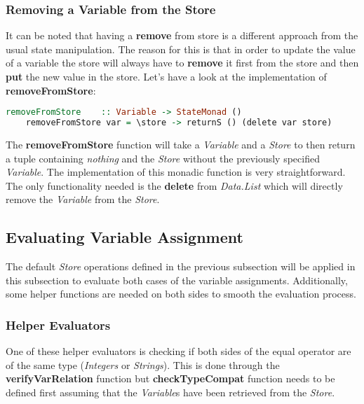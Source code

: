 \documentclass[a4paper, onecolumn]{article}
\begin{document}
    \subsubsection{Removing a Variable from the Store}
    
    It can be noted that having a \textbf{remove} from store is a different approach from the usual state manipulation. The reason for this is that in order to update the value of a variable the store will always have to \textbf{remove} it first from the store and then \textbf{put} the new value in the store. Let's have a look at the implementation of \textbf{removeFromStore}:
    
    \begin{tcolorbox}
    \begin{lstlisting}[language=Haskell] 
    removeFromStore    :: Variable -> StateMonad () 
    removeFromStore var = \store -> returnS () (delete var store) 
    \end{lstlisting}
    \end{tcolorbox}
    
    \noindent The \textbf{removeFromStore} function will take a \textit{Variable} and a \textit{Store} to then return a tuple containing \textit{nothing} and the \textit{Store} without the previously specified \textit{Variable}. The implementation of this monadic function is very straightforward. The only functionality needed is the \textbf{delete} from \textit{Data.List} which will directly remove the \textit{Variable} from the \textit{Store}.  
    
    \subsection{Evaluating Variable Assignment}
    
    The default \textit{Store} operations defined in the previous subsection will be applied in this subsection to evaluate both cases of the variable assignments. Additionally, some helper functions are needed on both sides to smooth the evaluation process. 
    
    \subsubsection{Helper Evaluators}
    
    One of these helper evaluators is checking if both sides of the equal operator are of the same type (\textit{Integers} or \textit{Strings}). This is done through the \textbf{verifyVarRelation} function but \textbf{checkTypeCompat} function needs to be defined first assuming that the \textit{Variable}s have been retrieved from the \textit{Store}. 
    
\end{document}
